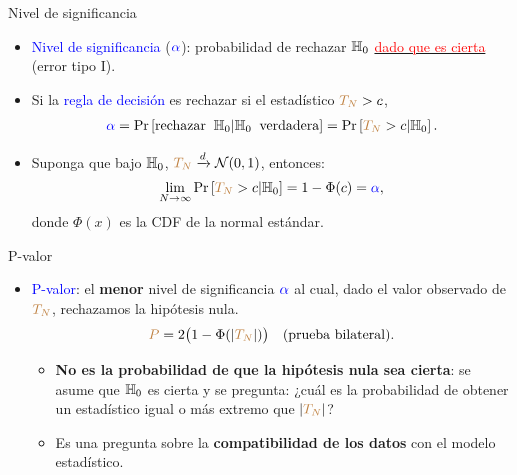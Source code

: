 \documentclass[10pt, xcolor=dvipsnames]{beamer}
\begin{document}
\begin{frame}{Nivel de significancia}
\begin{itemize}
    \item \textcolor{blue}{Nivel de significancia} ($\textcolor{blue}{\alpha}$): probabilidad de rechazar $\textcolor{black}{\mathbb{H}_{0}}$ \underline{\textcolor{red}{dado que es cierta}} (error tipo I).
    \medskip
    \item Si la \textcolor{blue}{regla de decisión} es rechazar si el estadístico $\textcolor{brown}{T_N}>c$,
    \begin{align*}
        \textcolor{blue}{\alpha} = \text{Pr}\left[\text{rechazar} \;\; \textcolor{black}{\mathbb{H}_{0}}|\textcolor{black}{\mathbb{H}_{0}}  \;\; \text{verdadera}\right] = \text{Pr}\left[\textcolor{brown}{T_N}>c|\textcolor{black}{\mathbb{H}_{0}}\right].
    \end{align*}
    \item Suponga que bajo $\textcolor{black}{\mathbb{H}_{0}}$, $\textcolor{brown}{T_N}\xrightarrow{d} \mathcal{N}(0,1)$, entonces:   
    \begin{align*}
    \begin{split}
    \lim_{N \rightarrow \infty} \text{Pr}\left[\textcolor{brown}{T_N}>c|\textcolor{black}{\mathbb{H}_{0}}\right] = 1-\Phi(c) = \textcolor{blue}{\alpha},
    \end{split}
    \end{align*}
    donde \(\Phi(x)\) es la CDF de la normal estándar.
    \end{itemize}
\end{frame}


\begin{frame}{P-valor}
\begin{itemize}
    \item \textcolor{blue}{P-valor}: el \textbf{menor} nivel de significancia $\textcolor{blue}{\alpha}$ al cual, dado el valor observado de $\textcolor{brown}{T_N}$, rechazamos la hipótesis nula.	
    \begin{align*}
    \begin{split}
        \textcolor{brown}{P} = 2\big(1-\Phi(|\textcolor{brown}{T_N}|)\big) \quad \text{(prueba bilateral)}.
    \end{split}
    \end{align*}
    \begin{itemize}
        \item \textbf{No es la probabilidad de que la hipótesis nula sea cierta}: se asume que $\textcolor{black}{\mathbb{H}_{0}}$ es cierta y se pregunta: ¿cuál es la probabilidad de obtener un estadístico igual o más extremo que $|\textcolor{brown}{T_N}|$?
        \smallspace
        \item Es una pregunta sobre la \textbf{compatibilidad de los datos} con el modelo estadístico.	
    \end{itemize}
\end{itemize}
\end{frame}
\end{document}

